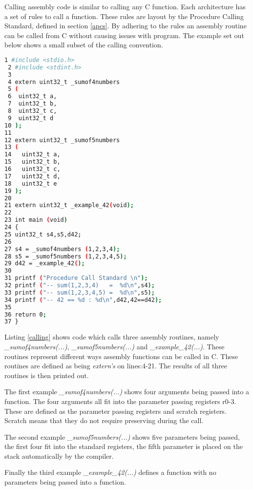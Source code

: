 Calling assembly code is similar to calling any C function. Each architecture has a set of rules to call a function. These rules are layout by the Procedure Calling Standard, defined in section \ref{apcs}. By adhering to the rules an assembly routine can be called from C without causing issues with program. The example set out below shows a small subset of the calling convention. 

\begin{lstlisting}[language=bash,showstringspaces=false,caption={File: calling.c},captionpos=b,label=calling]
 1 #include <stdio.h>
 2 #include <stdint.h>
 3 
 4 extern uint32_t _sumof4numbers
 5 (
 6  uint32_t a,
 7  uint32_t b,
 8  uint32_t c,
 9  uint32_t d
10 );
11 
12 extern uint32_t _sumof5numbers 
13 (
14   uint32_t a,
15   uint32_t b,
16   uint32_t c,
17   uint32_t d,
18   uint32_t e
19 );
20 
21 extern uint32_t _example_42(void);
22 
23 int main (void)
24 {
25 uint32_t s4,s5,d42;
26 
27 s4 = _sumof4numbers (1,2,3,4);
28 s5 = _sumof5numbers (1,2,3,4,5);
29 d42 = _example_42();
30 
31 printf ("Procedure Call Standard \n");
32 printf ("-- sum(1,2,3,4)   =  %d\n",s4);
33 printf ("-- sum(1,2,3,4,5) =  %d\n",s5);
34 printf ("-- 42 == %d : %d\n",d42,42==d42);
35 
36 return 0;
37 }
\end{lstlisting}

Listing \ref{calling} shows code which calls three assembly routines, namely \textit{\_sumof4numbers(...)}, \textit{\_sumof5numbers(...)} and \textit{\_example\_42(...)}. These routines represent different ways assembly functions can be called in C. These routines are defined as being \textit{extern's} on lines:4-21. The results of all three routines is then printed out.

The first example \textit{\_sumof4numbers(...)} shows four arguments being passed into a function. The four arguments all fit into the parameter passing registers r0-3. These are defined as the parameter passing registers and scratch registers. Scratch means that they do not require preserving during the call.

The second example \textit{\_sumof5numbers(...)} shows five parameters being passed, the first four fit into the standard registers, the fifth parameter is placed on the stack automatically by the compiler. 

Finally the third example \textit{\_example\_42(...)} defines a function with no parameters being passed into a function.

